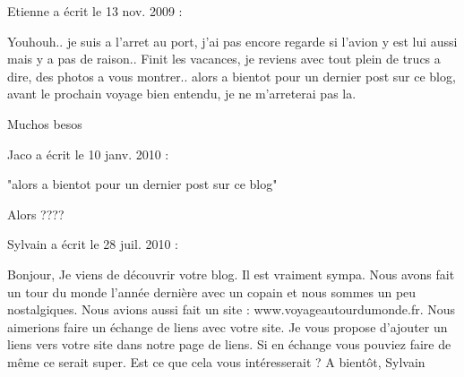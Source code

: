  \medskip
Etienne a écrit le 13 nov. 2009 :
\begin{displayquote}
Youhouh.. je suis a l'arret au port, j'ai pas encore regarde si l'avion y est lui aussi mais y a pas de raison..
Finit les vacances, je reviens avec tout plein de trucs a dire, des photos a vous montrer.. alors a bientot pour un dernier post sur ce blog, avant le prochain voyage bien entendu, je ne m'arreterai pas la.

Muchos besos
\end{displayquote}

 \medskip
Jaco a écrit le 10 janv. 2010 :
\begin{displayquote}
"alors a bientot pour un dernier post sur ce blog"

Alors ????
\end{displayquote}

 \medskip
Sylvain a écrit le 28 juil. 2010 :
\begin{displayquote}
Bonjour,
Je viens de découvrir votre blog. Il est vraiment sympa. Nous avons fait un tour du monde l'année dernière avec un copain et nous sommes un peu nostalgiques.
Nous avions aussi fait un site : www.voyageautourdumonde.fr. Nous aimerions faire un échange de liens avec votre site. Je vous propose d'ajouter un liens vers votre site dans notre page de liens. Si en échange vous pouviez faire de même ce serait super.
Est ce que cela vous intéresserait ?
A bientôt,
Sylvain
\end{displayquote}

